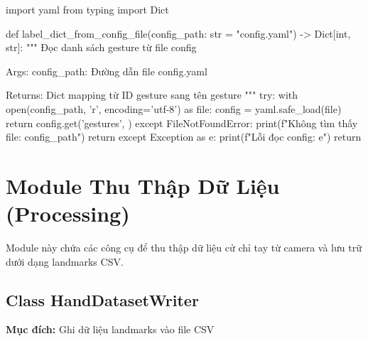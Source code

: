 \begin{aivncodebox}
\begin{python}
import yaml
from typing import Dict

def label_dict_from_config_file(config_path: str = "config.yaml") -> Dict[int, str]:
    """
    Đọc danh sách gesture từ file config
    
    Args:
        config_path: Đường dẫn file config.yaml
        
    Returns:
        Dict mapping từ ID gesture sang tên gesture
    """
    try:
        with open(config_path, 'r', encoding='utf-8') as file:
            config = yaml.safe_load(file)
            return config.get('gestures', {})
    except FileNotFoundError:
        print(f"Không tìm thấy file: {config_path}")
        return {}
    except Exception as e:
        print(f"Lỗi đọc config: {e}")
        return {}
\end{python}
\end{aivncodebox}




\section{Module Thu Thập Dữ Liệu (Processing)}

Module này chứa các công cụ để thu thập dữ liệu cử chỉ tay từ camera và lưu trữ dưới dạng landmarks CSV.

\subsection{Class HandDatasetWriter}
\textbf{Mục đích:} Ghi dữ liệu landmarks vào file CSV

